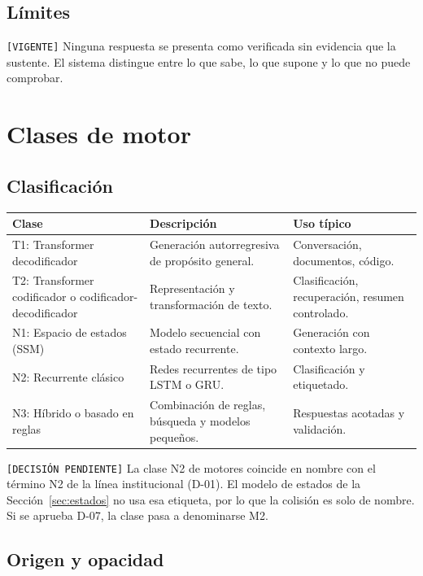 \documentclass[12pt]{article}
\begin{document}
\subsection{Límites}

\texttt{[VIGENTE]} Ninguna respuesta se presenta como verificada sin
evidencia que la sustente. El sistema distingue entre lo que sabe, lo que
supone y lo que no puede comprobar.

\section{Clases de motor}
\label{sec:motores}

\subsection{Clasificación}

\begin{longtable}{|p{3.6cm}|p{5.4cm}|p{5.4cm}|}
\hline
\textbf{Clase} & \textbf{Descripción} & \textbf{Uso típico} \\
\hline
\endhead
T1: Transformer decodificador & Generación autorregresiva de propósito general. & Conversación, documentos, código. \\
\hline
T2: Transformer codificador o codificador-decodificador & Representación y transformación de texto. & Clasificación, recuperación, resumen controlado. \\
\hline
N1: Espacio de estados (SSM) & Modelo secuencial con estado recurrente. & Generación con contexto largo. \\
\hline
N2: Recurrente clásico & Redes recurrentes de tipo LSTM o GRU. & Clasificación y etiquetado. \\
\hline
N3: Híbrido o basado en reglas & Combinación de reglas, búsqueda y modelos pequeños. & Respuestas acotadas y validación. \\
\hline
\end{longtable}

\texttt{[DECISIÓN PENDIENTE]} La clase N2 de motores coincide en nombre con
el término N2 de la línea institucional (D-01). El modelo de estados de la
Sección~\ref{sec:estados} no usa esa etiqueta, por lo que la colisión es solo
de nombre. Si se aprueba D-07, la clase pasa a denominarse M2.

\subsection{Origen y opacidad}
\end{document}
